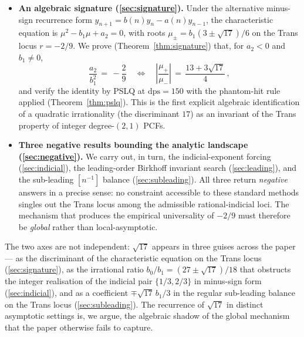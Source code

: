 \documentclass[11pt]{amsart}
\theoremstyle{definition}
\theoremstyle{remark}
\newcommand{\dps}{\mathrm{dps}}
\begin{document}
\begin{itemize}[leftmargin=1.4em]
\item \textbf{An algebraic signature
(\textsection\ref{sec:signature}).}  Under the alternative
minus-sign recurrence form
$y_{n+1} = b(n)y_n - a(n)y_{n-1}$, the
characteristic equation is $\mu^2 - b_1\mu + a_2 = 0$, with roots
$\mu_\pm = b_1(3\pm\sqrt{17})/6$ on the Trans locus $r=-2/9$.  We
prove (Theorem~\ref{thm:signature}) that, for $a_2<0$ and
$b_1\ne 0$,
\[
  \frac{a_2}{b_1^2} \,=\, -\frac{2}{9}
  \quad\Longleftrightarrow\quad
  \left|\frac{\mu_+}{\mu_-}\right| \,=\, \frac{13 + 3\sqrt{17}}{4}\,,
\]
and verify the identity by PSLQ at $\dps = 150$ with the phantom-hit
rule applied (Theorem~\ref{thm:pslq}).  This is the first explicit
algebraic identification of a quadratic irrationality (the discriminant
$17$) as an invariant of the Trans property of integer
degree-$(2,1)$ PCFs.
\item \textbf{Three negative results bounding the analytic landscape
(\textsection\ref{sec:negative}).}  We carry out, in turn, the
indicial-exponent forcing (\textsection\ref{sec:indicial}), the
leading-order Birkhoff invariant search
(\textsection\ref{sec:leading}), and the sub-leading $[n^{-1}]$
balance (\textsection\ref{sec:subleading}).  All three return
\emph{negative} answers in a precise sense: no constraint accessible
to these standard methods singles out the Trans locus among the
admissible rational-indicial loci.  The mechanism that produces the
empirical universality of $-2/9$ must therefore be \emph{global}
rather than local-asymptotic.
\end{itemize}

The two axes are not independent: $\sqrt{17}$ appears in three guises
across the paper --- as the discriminant of the characteristic
equation on the Trans locus
(\textsection\ref{sec:signature}), as the irrational ratio
$b_0/b_1=(27\pm\sqrt{17})/18$ that obstructs the integer realisation
of the indicial pair $\{1/3,2/3\}$ in minus-sign form
(\textsection\ref{sec:indicial}), and as a coefficient
$\mp\sqrt{17}\,b_1/3$ in the regular sub-leading balance on the Trans
locus (\textsection\ref{sec:subleading}).  The recurrence of
$\sqrt{17}$ in distinct asymptotic settings is, we argue, the
algebraic shadow of the global mechanism that the paper otherwise
fails to capture.
\end{document}
